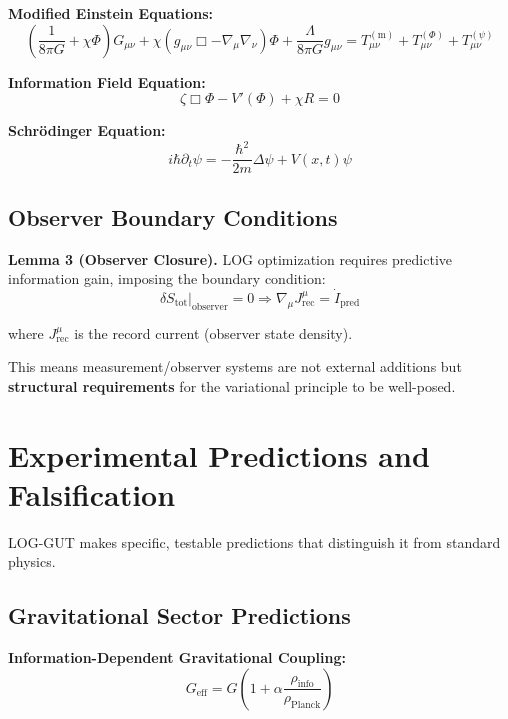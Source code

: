 \documentclass[12pt]{article}
\begin{document}
\textbf{Modified Einstein Equations:}
\begin{equation}
\left(\frac{1}{8\pi G} + \chi \Phi\right)G_{\mu\nu} + \chi(g_{\mu\nu}\Box - \nabla_\mu\nabla_\nu)\Phi + \frac{\Lambda}{8\pi G}g_{\mu\nu} = T_{\mu\nu}^{(\mathrm{m})} + T_{\mu\nu}^{(\Phi)} + T_{\mu\nu}^{(\psi)} \tag{4.2}
\end{equation}

\textbf{Information Field Equation:}
\begin{equation}
\zeta \Box\Phi - V'(\Phi) + \chi R = 0 \tag{4.3}
\end{equation}

\textbf{Schrödinger Equation:}
\begin{equation}
i\hbar \partial_t \psi = -\frac{\hbar^2}{2m}\Delta \psi + V(x,t)\psi \tag{4.4}
\end{equation}

\subsection{Observer Boundary Conditions}

\textbf{Lemma 3 (Observer Closure).} LOG optimization requires predictive information gain, imposing the boundary condition:
\begin{equation}
\delta S_{\mathrm{tot}}|_{\mathrm{observer}} = 0 \Rightarrow \nabla_\mu J^\mu_{\mathrm{rec}} = \dot I_{\mathrm{pred}} \tag{4.5}
\end{equation}

where $J^\mu_{\mathrm{rec}}$ is the record current (observer state density).

This means measurement/observer systems are not external additions but \textbf{structural requirements} for the variational principle to be well-posed.

\section{Experimental Predictions and Falsification}

LOG-GUT makes specific, testable predictions that distinguish it from standard physics.

\subsection{Gravitational Sector Predictions}

\textbf{Information-Dependent Gravitational Coupling:}
\begin{equation}
G_{\mathrm{eff}} = G\left(1 + \alpha \frac{\rho_{\mathrm{info}}}{\rho_{\mathrm{Planck}}}\right) \tag{5.1}
\end{equation}
\end{document}
